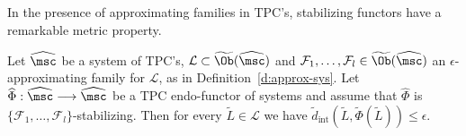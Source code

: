   In the presence of approximating families in TPC's,
    stabilizing functors have a remarkable metric property.
    \begin{prop} \label{p:stab-func} Let $\widehat{\msc}$ be a system
      of TPC's, $\mathcal{L} \subset \widetilde{\Ob}(\widehat{\msc})$
      and
      $\mathcal{F}_1, \ldots, \mathcal{F}_l \in
      \widetilde{\Ob}(\widehat{\msc})$ an $\epsilon$-approximating
      family for $\mathcal{L}$, as in Definition~\ref{d:approx-sys}.
      Let
      $\widehat{\Phi}: \widehat{\msc} \longrightarrow \widehat{\msc}$
      be a TPC endo-functor of systems and assume that
      $\widehat{\Phi}$ is
      $\{\mathcal{F}_1, \ldots, \mathcal{F}_l\}$-stabilizing. Then for
      every $\widetilde{L} \in \mathcal{L}$ we have
      $\widetilde{d}_{\text{int}}(\widetilde{L},
      \widetilde{\Phi}(\widetilde{L})) \leq \epsilon$.
  \end{prop}



